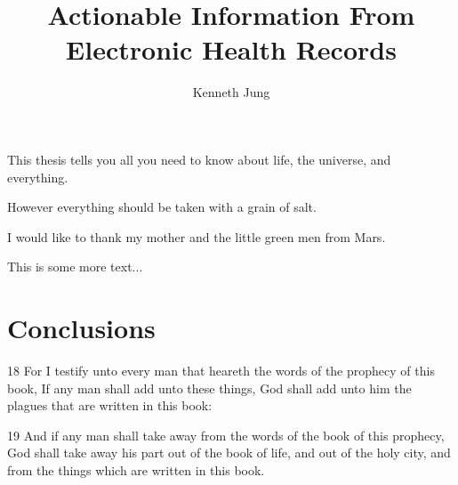 \documentclass[12pt]{report}
\title{Actionable Information From Electronic Health Records}
\author{Kenneth Jung}
\begin{document}

    \beforepreface


        This thesis tells you all you need to know about life, the
        universe, and everything.

\newpage

However everything should be taken with a grain of salt.

        I would like to thank my mother and the little green men from
        Mars. 

    \afterpreface
 

This is some more text... 

    \chapter{Conclusions}
    
    18 For I testify unto every man that heareth the words of the
    prophecy of this book, If any man shall add unto these things, God
    shall add unto him the plagues that are written in this book:
    
    19 And if any man shall take away from the words of the book of
    this prophecy, God shall take away his part out of the book of
    life, and out of the holy city, and from the things which are
    written in this book.
\end{document}

